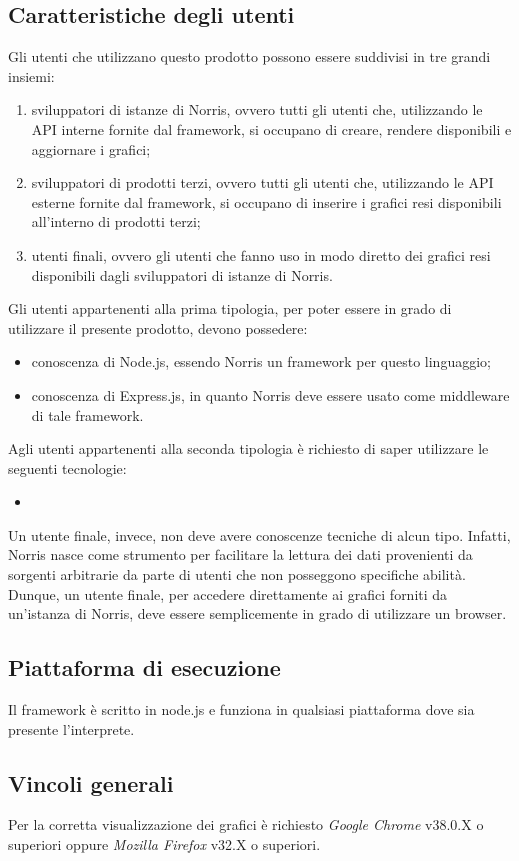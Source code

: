 	\subsection{Caratteristiche degli utenti}
		Gli utenti che utilizzano questo prodotto possono essere suddivisi in tre grandi insiemi:
		\begin{enumerate}
			\item sviluppatori di istanze di Norris, ovvero tutti gli utenti che, utilizzando le API interne fornite dal framework, si occupano di creare, rendere disponibili e aggiornare i grafici;
			\item sviluppatori di prodotti terzi, ovvero tutti gli utenti che, utilizzando le API esterne fornite dal framework, si occupano di inserire i grafici resi disponibili all'interno di prodotti terzi;
			\item utenti finali, ovvero gli utenti che fanno uso in modo diretto dei grafici resi disponibili dagli sviluppatori di istanze di Norris.
		\end{enumerate}
		Gli utenti appartenenti alla prima tipologia, per poter essere in grado di utilizzare il presente prodotto, devono possedere:
		\begin{itemize}
			\item conoscenza di Node.js, essendo Norris un framework per questo linguaggio;
			\item conoscenza di Express.js, in quanto Norris deve essere usato come middleware di tale framework.
		\end{itemize}
		Agli utenti appartenenti alla seconda tipologia è richiesto di saper utilizzare le seguenti tecnologie:
		\begin{itemize}
			\item 
		\end{itemize}
		Un utente finale, invece, non deve avere conoscenze tecniche di alcun tipo. Infatti, Norris nasce come strumento per facilitare la lettura dei dati provenienti da sorgenti arbitrarie da parte di utenti che non posseggono specifiche abilità. Dunque, un utente finale, per accedere direttamente ai grafici forniti da un'istanza di Norris, deve essere semplicemente in grado di utilizzare un browser.\\
	\subsection{Piattaforma di esecuzione}
		Il framework è scritto in node.js e funziona in qualsiasi piattaforma dove sia presente l'interprete.
	\subsection{Vincoli generali}
		Per la corretta visualizzazione dei grafici è richiesto \emph{Google Chrome} v38.0.X o superiori oppure \emph{Mozilla Firefox} v32.X o superiori.
